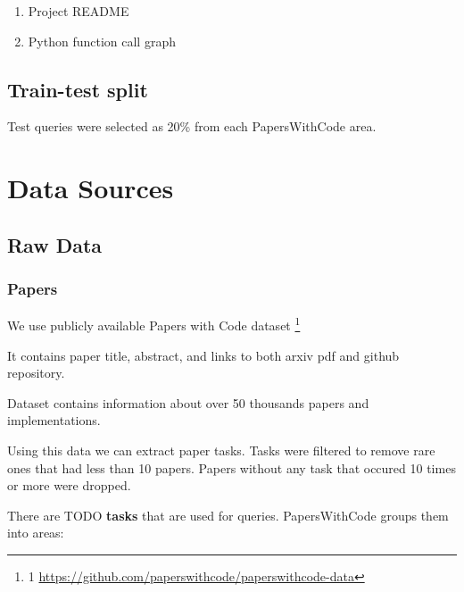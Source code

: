 \documentclass[11pt]{report}
\begin{document}
\begin{enumerate}

\item Project README

\item Python function call graph

\end{enumerate}


\subsection{Train-test split}

Test queries were selected as 20\% from each PapersWithCode area.



\section{Data Sources}

\subsection{Raw Data}

\subsubsection{Papers}

We use publicly available Papers with Code dataset \footnote{1 \url{https://github.com/paperswithcode/paperswithcode-data}}

It contains paper title, abstract, and links to both arxiv pdf and github repository.

Dataset contains information about over 50 thousands papers and implementations.

Using this data we can extract paper tasks. Tasks were filtered to remove rare ones that had less than 10 papers. Papers without any task that occured 10 times or more were dropped.

There are TODO \textbf{tasks} that are used for queries. PapersWithCode groups them into areas:
\end{document}
